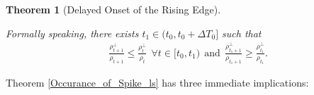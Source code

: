 \documentclass[pdflatex,sn-basic]{sn-jnl}%
\theoremstyle{thmstyleone}%
\newtheorem{theorem}{Theorem}%
\begin{document}
\begin{theorem}[Delayed Onset of the Rising Edge]
\begin{enumerate}
    Formally speaking, there exists $t_1 \in (t_0, t_0 + \Delta T_0]$ such that 
    \begin{equation*}
    \begin{aligned}
      & \frac{\rho_{t+1}^{\perp}}{\rho_{t+1}} \le \frac{\rho_{t}^{\perp}}{\rho_{t}} \ \ \forall t \in [t_0, t_1)
      \ \ \text{and} \ \ 
      \frac{\rho_{t_1+1}^{\perp}}{\rho_{t_1+1}} \ge \frac{\rho_{t_1}^{\perp}}{\rho_{t_1}}.
    \end{aligned}
    \end{equation*}
  \end{enumerate} 
\end{theorem}
Theorem \ref{Occurance_of_Spike_ls} has three immediate implications:
\end{document}
